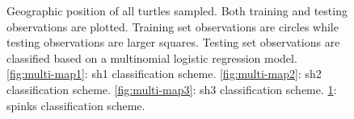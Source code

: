 \documentclass{article}\usepackage{graphicx, color}
\makeatletter
\newenvironment{kframe}{%
 \def\at@end@of@kframe{}%
 \ifinner\ifhmode%
  \def\at@end@of@kframe{\end{minipage}}%
  \begin{minipage}{\columnwidth}%
 \fi\fi%
 \def\FrameCommand##1{\hskip\@totalleftmargin \hskip-\fboxsep
 \colorbox{shadecolor}{##1}\hskip-\fboxsep
     \hskip-\linewidth \hskip-\@totalleftmargin \hskip\columnwidth}%
 \MakeFramed {\advance\hsize-\width
   \@totalleftmargin\z@ \linewidth\hsize
   \@setminipage}}%
 {\par\unskip\endMakeFramed%
 \at@end@of@kframe}
\newenvironment{knitrout}{}{} %
\makeatother
\begin{document}
\begin{figure}[t]
\begin{subfigure}[b]{0.5\textwidth}
    \label{fig:multi-map4}
  \end{subfigure}
  \caption{Geographic position of all turtles sampled. Both training and testing observations are plotted. Training set observations are circles while testing observations are larger squares. Testing set observations are classified based on a multinomial logistic regression model. \ref{fig:multi-map1}: sh1 classification scheme. \ref{fig:multi-map2}: sh2 classification scheme. \ref{fig:multi-map3}: sh3 classification scheme. \ref{fig:multi-map4}: spinks classification scheme.}
  \label{fig:multi-map}
\end{figure}

\begin{knitrout}
\color{fgcolor}\begin{kframe}


{\ttfamily\noindent\bfseries\color{errorcolor}{\#\# Error: object 'tnn.class' not found}}

{\ttfamily\noindent\bfseries\color{errorcolor}{\#\# Error: object 'tnn.class.tiny' not found}}

{\ttfamily\noindent\bfseries\color{errorcolor}{\#\# Error: object 'tnn.map' not found}}\end{kframe}
\end{knitrout}
\end{document}

